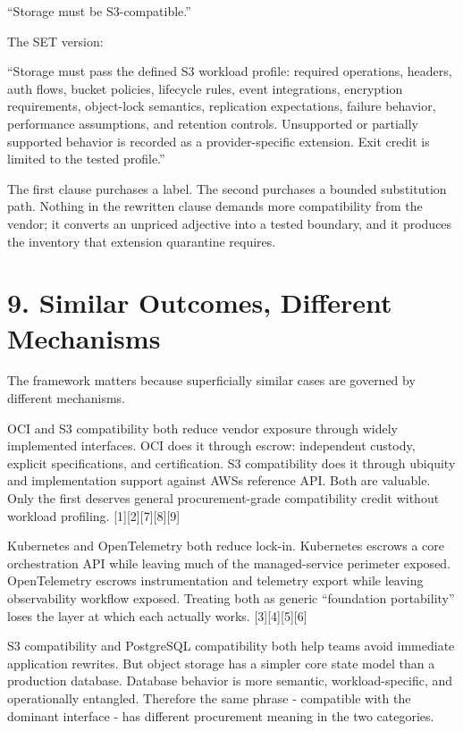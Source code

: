 \documentclass[11pt]{article}
\begin{document}
``Storage must be S3-compatible.''

The SET version:

``Storage must pass the defined S3 workload profile: required operations, headers, auth flows, bucket policies, lifecycle rules, event integrations, encryption requirements, object-lock semantics, replication expectations, failure behavior, performance assumptions, and retention controls. Unsupported or partially supported behavior is recorded as a provider-specific extension. Exit credit is limited to the tested profile.''

The first clause purchases a label. The second purchases a bounded substitution path. Nothing in the rewritten clause demands more compatibility from the vendor; it converts an unpriced adjective into a tested boundary, and it produces the inventory that extension quarantine requires.


\section{9. Similar Outcomes, Different Mechanisms}\label{similar-outcomes-different-mechanisms}

The framework matters because superficially similar cases are governed by different mechanisms.

OCI and S3 compatibility both reduce vendor exposure through widely implemented interfaces. OCI does it through escrow: independent custody, explicit specifications, and certification. S3 compatibility does it through ubiquity and implementation support against AWS\textquotesingle s reference API. Both are valuable. Only the first deserves general procurement-grade compatibility credit without workload profiling. {[}1{]}{[}2{]}{[}7{]}{[}8{]}{[}9{]}

Kubernetes and OpenTelemetry both reduce lock-in. Kubernetes escrows a core orchestration API while leaving much of the managed-service perimeter exposed. OpenTelemetry escrows instrumentation and telemetry export while leaving observability workflow exposed. Treating both as generic ``foundation portability'' loses the layer at which each actually works. {[}3{]}{[}4{]}{[}5{]}{[}6{]}

S3 compatibility and PostgreSQL compatibility both help teams avoid immediate application rewrites. But object storage has a simpler core state model than a production database. Database behavior is more semantic, workload-specific, and operationally entangled. Therefore the same phrase - compatible with the dominant interface - has different procurement meaning in the two categories.
\end{document}

